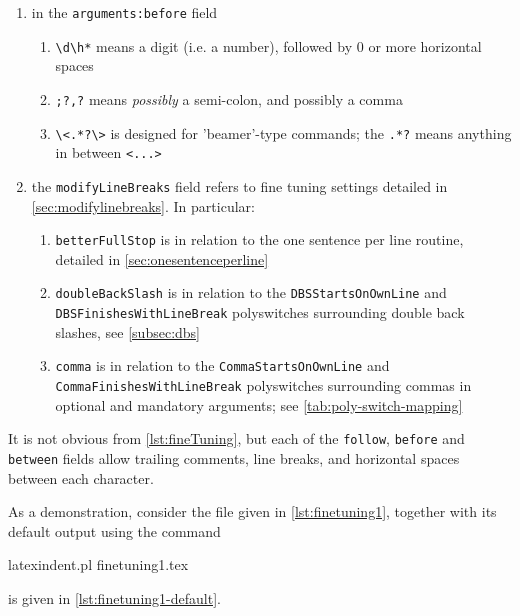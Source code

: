 \begin{enumerate}
\begin{enumerate}
	      \end{enumerate}
	\item in the \texttt{arguments:before} field
	      \begin{enumerate}
            \item \lstinline^\d\h*^ means a digit (i.e. a number), followed by 0 or more horizontal spaces
		      \item \lstinline^;?,?^ means \emph{possibly} a semi-colon, and possibly a comma
		      \item \lstinline^\<.*?\>^ is designed for 'beamer'-type commands; the \lstinline^.*?^ means anything in between \lstinline^<...>^
	      \end{enumerate}
        \item the \texttt{modifyLineBreaks} field refers to fine tuning settings detailed in \vref{sec:modifylinebreaks}. In particular:
	      \begin{enumerate}
            \item \texttt{betterFullStop} is in relation to the one sentence per line routine, detailed in \vref{sec:onesentenceperline}
            \item \texttt{doubleBackSlash} is in relation to the \texttt{DBSStartsOnOwnLine} and \texttt{DBSFinishesWithLineBreak} polyswitches surrounding double back slashes, see \vref{subsec:dbs}
            \item \texttt{comma} is in relation to the \texttt{CommaStartsOnOwnLine} and \texttt{CommaFinishesWithLineBreak} polyswitches surrounding commas in optional and mandatory arguments; see \vref{tab:poly-switch-mapping}
	      \end{enumerate}
\end{enumerate}

It is not obvious from \cref{lst:fineTuning}, but each of the \texttt{follow}, \texttt{before} and \texttt{between} fields
allow trailing comments, line breaks, and horizontal spaces between each character.

As a demonstration, consider the file given in \cref{lst:finetuning1}, together with its default output using the command
\begin{commandshell}
latexindent.pl finetuning1.tex 
\end{commandshell}
is given in \cref{lst:finetuning1-default}.

        \begin{cmhtcbraster}[raster column skip=.01\linewidth]
        \end{cmhtcbraster}

